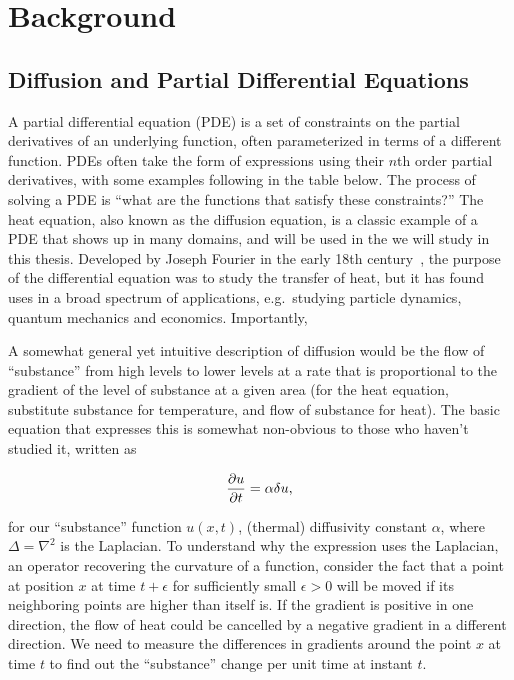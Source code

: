 \documentclass[../main.tex]{subfiles}
\begin{document}
    \chapter{Background}\label{ch:background}

    \section{Diffusion and Partial Differential Equations}\label{sec:diffusion}
    A partial differential equation (PDE) is a set of constraints on the partial derivatives of an underlying function, often parameterized in terms of a different function.
    PDEs often take the form of expressions using their $n$th order partial derivatives, with some examples following in the table below.
    The process of solving a PDE is ``what are the functions that satisfy these constraints?''
    The heat equation, also known as the diffusion equation, is a classic example of a PDE that shows up in many domains, and will be used in the  we will study in this thesis.
    Developed by Joseph Fourier in the early 18th century~\cite{narasimhanFourierHeatConduction1999}, the purpose of the differential equation was to study the transfer of heat, but it has found uses in a broad spectrum of applications, e.g.\ studying particle dynamics, quantum mechanics and economics.
    Importantly,

    A somewhat general yet intuitive description of diffusion would be the flow of ``substance'' from high levels to lower levels at a rate that is proportional to the gradient of the level of substance at a given area (for the heat equation, substitute substance for temperature, and flow of substance for heat).
    The basic equation that expresses this is somewhat non-obvious to those who haven't studied it, written as

    \begin{equation}
        \frac{\partial u}{\partial t} = \alpha\delta u,\label{eq:basic-heat}
    \end{equation}

    for our ``substance'' function $u(x, t)$, (thermal) diffusivity constant $\alpha$, where $\Delta = \nabla^2$ is the Laplacian.
    To understand why the expression uses the Laplacian, an operator recovering the curvature of a function, consider the fact that a point at position $x$ at time $t + \epsilon$ for sufficiently small $\epsilon > 0$ will be moved if its
    neighboring points are higher than itself is.
    If the gradient is positive in one direction, the flow of heat could be cancelled by a negative gradient in a different direction.
    We need to measure the differences in gradients around the point $x$ at time $t$ to find out the ``substance'' change per unit time at instant $t$.
\end{document}
